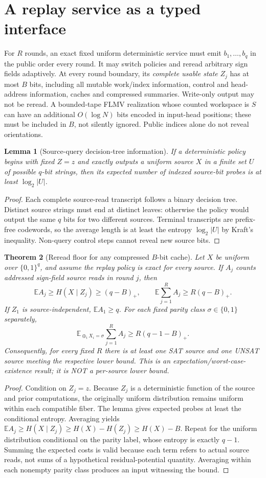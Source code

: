\documentclass[11pt]{article}
\newtheorem{theorem}{Theorem}
\newtheorem{lemma}[theorem]{Lemma}
\begin{document}
\section{A replay service as a typed interface}
For $R$ rounds, an exact fixed uniform deterministic service must emit $b_1,\ldots,b_q$ in the public order every round. It may switch policies and reread arbitrary sign fields adaptively. At every round boundary, its \emph{complete usable state} $Z_j$ has at most $B$ bits, including all mutable work/index information, control and head-address information, caches and compressed summaries. Write-only output may not be reread. A bounded-tape FLMV realization whose counted workspace is $S$ can have an additional $O(\log N)$ bits encoded in input-head positions; these must be included in $B$, not silently ignored. Public indices alone do not reveal orientations.
\begin{lemma}[Source-query decision-tree information]
If a deterministic policy begins with fixed $Z=z$ and exactly outputs a uniform source $X$ in a finite set $U$ of possible $q$-bit strings, then its expected number of indexed source-bit probes is at least $\log_2|U|$.
\end{lemma}
\begin{proof}
Each complete source-read transcript follows a binary decision tree. Distinct source strings must end at distinct leaves: otherwise the policy would output the same $q$ bits for two different sources. Terminal transcripts are prefix-free codewords, so the average length is at least the entropy $\log_2|U|$ by Kraft's inequality. Non-query control steps cannot reveal new source bits.
\end{proof}
\begin{theorem}[Reread floor for any compressed $B$-bit cache]
Let $X$ be uniform over $\{0,1\}^q$, and assume the replay policy is exact for every source. If $A_j$ counts addressed sign-field source reads in round $j$, then
\[
\mathbb E A_j\ge H(X\mid Z_j)\ge(q-B)_+,\qquad
\mathbb E\sum_{j=1}^R A_j\ge R(q-B)_+.
\]
If $Z_1$ is source-independent, $\mathbb E A_1\ge q$. For each fixed parity class $\sigma\in\{0,1\}$ separately,
\[
\boxed{\mathbb E_{\oplus_i X_i=\sigma}\sum_{j=1}^R A_j
\ge R(q-1-B)_+.}
\]
Consequently, for every fixed $R$ there is at least one SAT source and one UNSAT source meeting the respective lower bound. This is an expectation/worst-case-existence result; it is NOT a per-source lower bound.
\end{theorem}
\begin{proof}
Condition on $Z_j=z$. Because $Z_j$ is a deterministic function of the source and prior computations, the originally uniform distribution remains uniform within each compatible fiber. The lemma gives expected probes at least the conditional entropy. Averaging yields $\mathbb E A_j\ge H(X\mid Z_j)\ge H(X)-H(Z_j)\ge H(X)-B$. Repeat for the uniform distribution conditional on the parity label, whose entropy is exactly $q-1$. Summing the expected costs is valid because each term refers to actual source reads, not sums of a hypothetical residual-potential quantity. Averaging within each nonempty parity class produces an input witnessing the bound.
\end{proof}
\end{document}
